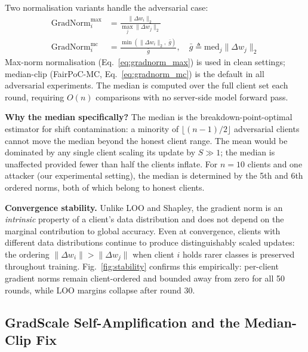 \documentclass[journal]{IEEEtran}
\theoremstyle{definition}
\theoremstyle{remark}
\begin{document}
Two normalisation variants handle the adversarial case:
\begin{align}
  \mathrm{GradNorm}_i^{\mathrm{max}}
    &= \frac{\|\Delta w_i\|_2}{\max_j \|\Delta w_j\|_2}
  \label{eq:gradnorm_max} \\
  \mathrm{GradNorm}_i^{\mathrm{mc}}
    &= \frac{\min\!\left(\|\Delta w_i\|_2,\;
       \bar{g}\right)}{\bar{g}},\quad
       \bar{g} \triangleq \mathrm{med}_j\|\Delta w_j\|_2
  \label{eq:gradnorm_mc}
\end{align}
Max-norm normalisation (Eq.~\ref{eq:gradnorm_max}) is used in clean
settings; median-clip (FairPoC-MC, Eq.~\ref{eq:gradnorm_mc}) is the
default in all adversarial experiments.
The median is computed over the full client set each round, requiring
$O(n)$ comparisons with no server-side model forward pass.

\textbf{Why the median specifically?}
The median is the breakdown-point-optimal estimator for shift
contamination: a minority of $\lfloor(n-1)/2\rfloor$ adversarial
clients cannot move the median beyond the honest client range.
The mean would be dominated by any single client scaling its update
by $S \gg 1$; the median is unaffected provided fewer than half the
clients inflate.
For $n = 10$ clients and one attacker (our experimental setting),
the median is determined by the 5th and 6th ordered norms, both of
which belong to honest clients.

\textbf{Convergence stability.}
Unlike LOO and Shapley, the gradient norm is an \emph{intrinsic}
property of a client's data distribution and does not depend on the
marginal contribution to global accuracy.
Even at convergence, clients with different data distributions
continue to produce distinguishably scaled updates: the ordering
$\|\Delta w_i\| > \|\Delta w_j\|$ when client $i$ holds rarer
classes is preserved throughout training.
Fig.~\ref{fig:stability} confirms this empirically: per-client
gradient norms remain client-ordered and bounded away from zero
for all 50 rounds, while LOO margins collapse after round 30.

\subsection{GradScale Self-Amplification and the Median-Clip Fix}
\label{subsec:amplification}
\end{document}
